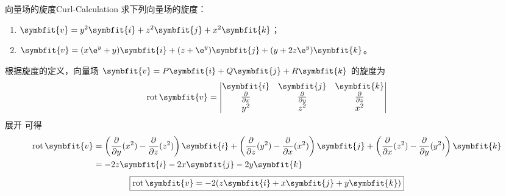 \begin{problem}{向量场的旋度}{Curl-Calculation}
    求下列向量场的旋度：
    \begin{enumerate}
        \item $\symbfit{v} = y^2 \symbfit{i} + z^2 \symbfit{j} + x^2 \symbfit{k}$；
        \item $\symbfit{v} = (x \e^y + y)\symbfit{i} + (z + \e^y)\symbfit{j} + (y + 2z \e^y)\symbfit{k}$。
    \end{enumerate}
\end{problem}

\begin{solution}

    根据旋度的定义，向量场 $\symbfit{v} = P \symbfit{i} + Q \symbfit{j} + R \symbfit{k}$ 的旋度为
    \begin{equation} \label{eq:curl-def-1}
        \operatorname{rot} \symbfit{v} = \begin{vmatrix} \symbfit{i} & \symbfit{j} & \symbfit{k} \\ \frac{\partial}{\partial x} & \frac{\partial}{\partial y} & \frac{\partial}{\partial z} \\ y^2 & z^2 & x^2 \end{vmatrix}
    \end{equation}
    展开  可得
    \begin{equation} \label{eq:curl-res-1}
        \begin{aligned}
            \operatorname{rot} \symbfit{v} & = \left( \frac{\partial}{\partial y} (x^2) - \frac{\partial}{\partial z} (z^2) \right) \symbfit{i} + \left( \frac{\partial}{\partial z} (y^2) - \frac{\partial}{\partial x} (x^2) \right) \symbfit{j} + \left( \frac{\partial}{\partial x} (z^2) - \frac{\partial}{\partial y} (y^2) \right) \symbfit{k} \\
                                                   & = -2z \symbfit{i} - 2x \symbfit{j} - 2y \symbfit{k}
        \end{aligned}
    \end{equation}
    \begin{equation}
        \boxed{\operatorname{rot} \symbfit{v} = -2(z \symbfit{i} + x \symbfit{j} + y \symbfit{k})}
    \end{equation}



\end{solution}
